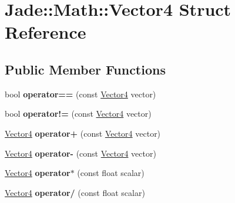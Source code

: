 \hypertarget{struct_jade_1_1_math_1_1_vector4}{}\section{Jade\+:\+:Math\+:\+:Vector4 Struct Reference}
\label{struct_jade_1_1_math_1_1_vector4}
\subsection*{Public Member Functions}
\begin{DoxyCompactItemize}
\item 
\hypertarget{struct_jade_1_1_math_1_1_vector4_aab69b9a478483051acf89991669b9fc0}{}bool {\bfseries operator==} (const \hyperlink{struct_jade_1_1_math_1_1_vector4}{Vector4} vector)\label{struct_jade_1_1_math_1_1_vector4_aab69b9a478483051acf89991669b9fc0}

\item 
\hypertarget{struct_jade_1_1_math_1_1_vector4_a1af27df772e177edf757d2d6e942037a}{}bool {\bfseries operator!=} (const \hyperlink{struct_jade_1_1_math_1_1_vector4}{Vector4} vector)\label{struct_jade_1_1_math_1_1_vector4_a1af27df772e177edf757d2d6e942037a}

\item 
\hypertarget{struct_jade_1_1_math_1_1_vector4_a2cd525987dc8b64caceb082e94551970}{}\hyperlink{struct_jade_1_1_math_1_1_vector4}{Vector4} {\bfseries operator+} (const \hyperlink{struct_jade_1_1_math_1_1_vector4}{Vector4} vector)\label{struct_jade_1_1_math_1_1_vector4_a2cd525987dc8b64caceb082e94551970}

\item 
\hypertarget{struct_jade_1_1_math_1_1_vector4_a5bf1ab468224593a37c536f445dd4df7}{}\hyperlink{struct_jade_1_1_math_1_1_vector4}{Vector4} {\bfseries operator-\/} (const \hyperlink{struct_jade_1_1_math_1_1_vector4}{Vector4} vector)\label{struct_jade_1_1_math_1_1_vector4_a5bf1ab468224593a37c536f445dd4df7}

\item 
\hypertarget{struct_jade_1_1_math_1_1_vector4_a0a85a222ecb0e1430f9c62bbbbd34893}{}\hyperlink{struct_jade_1_1_math_1_1_vector4}{Vector4} {\bfseries operator$\ast$} (const float scalar)\label{struct_jade_1_1_math_1_1_vector4_a0a85a222ecb0e1430f9c62bbbbd34893}

\item 
\hypertarget{struct_jade_1_1_math_1_1_vector4_a3990b149cc7543732895db014efc5137}{}\hyperlink{struct_jade_1_1_math_1_1_vector4}{Vector4} {\bfseries operator/} (const float scalar)\label{struct_jade_1_1_math_1_1_vector4_a3990b149cc7543732895db014efc5137}


\end{DoxyCompactItemize}
